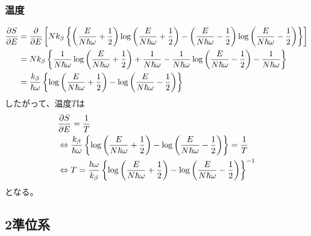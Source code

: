 \documentclass{jsarticle}  %
\numberwithin{equation}{section} %
\numberwithin{figure}{section}
\begin{document}
\subsubsection{温度}
    \begin{align}
        \frac{\partial S}{\partial E} &= \frac{\partial }{\partial E} \left[ Nk_\beta \left\{ \left( \frac{E}{N \hbar \omega} + \frac{1}{2} \right)\log \left( \frac{E}{N \hbar \omega} + \frac{1}{2} \right) - \left( \frac{E}{N \hbar \omega} - \frac{1}{2} \right)\log \left( \frac{E}{N \hbar \omega} - \frac{1}{2} \right) \right\} \right] \notag \\
        &= Nk_\beta \left\{ \frac{1}{N \hbar \omega} \log \left( \frac{E}{N \hbar \omega} + \frac{1}{2} \right) + \frac{1}{N\hbar \omega } - \frac{1}{N \hbar \omega} \log \left( \frac{E}{N \hbar \omega} - \frac{1}{2} \right) - \frac{1}{N\hbar \omega} \right\} \notag \\
        &= \frac{k_\beta}{ \hbar \omega} \left\{ \log \left( \frac{E}{N \hbar \omega} + \frac{1}{2} \right) - \log \left( \frac{E}{N \hbar \omega} - \frac{1}{2} \right) \right\} \notag
    \end{align}
    したがって、温度$T$は
    \begin{align}
        &\frac{\partial S}{\partial E} = \frac{1}{T} \notag \\
        &\Leftrightarrow \frac{k_\beta}{ \hbar \omega} \left\{ \log \left( \frac{E}{N \hbar \omega} + \frac{1}{2} \right) - \log \left( \frac{E}{N \hbar \omega} - \frac{1}{2} \right) \right\} = \frac{1}{T} \notag \\
        &\Leftrightarrow T = \frac{\hbar \omega}{k_\beta} \left\{ \log \left( \frac{E}{N \hbar \omega} + \frac{1}{2} \right) - \log \left( \frac{E}{N \hbar \omega} - \frac{1}{2} \right) \right\}^{-1}
    \end{align}
    となる。
\subsection{2準位系}
\end{document}
